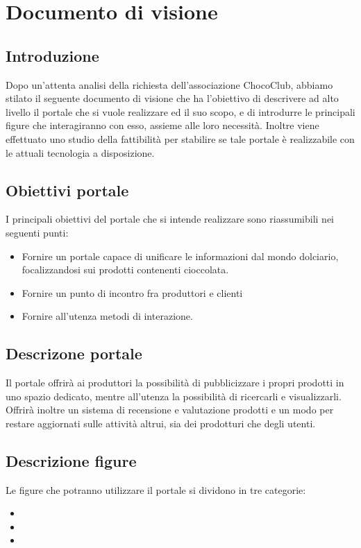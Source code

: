 \chapter{Documento di visione} 
\label{cha:documento_di_visione}

\section{Introduzione}
\label{sec:introduzione}
Dopo un'attenta analisi della richiesta dell'associazione ChocoClub, abbiamo stilato il seguente documento di visione che ha l'obiettivo di descrivere ad alto livello il portale che si vuole realizzare ed il suo scopo, e di introdurre le principali figure che interagiranno con esso, assieme alle loro necessità. Inoltre viene effettuato uno studio della fattibilità per stabilire se tale portale è realizzabile con le attuali tecnologia a disposizione.

\section{Obiettivi portale} 
\label{sec:descrizione_portale}
I principali obiettivi del portale che si intende realizzare sono riassumibili nei seguenti punti:
\begin{itemize}
	\item Fornire un portale capace di unificare le informazioni dal mondo dolciario, focalizzandosi sui prodotti contenenti cioccolata.
	\item Fornire un punto di incontro fra produttori e clienti
	\item Fornire all'utenza metodi di interazione.
\end{itemize}

\section{Descrizone portale}
\label{sec:descrizone_portale}
Il portale offrirà ai produttori la possibilità di pubblicizzare i propri prodotti in uno spazio dedicato, mentre all'utenza la possibilità di ricercarli e visualizzarli. Offrirà inoltre un sistema di recensione e valutazione prodotti e un modo per restare aggiornati sulle attività altrui, sia dei prodotturi che degli utenti.

\section{Descrizione figure} 
\label{sec:descrizionefigure}
Le figure che potranno utilizzare il portale si dividono in tre categorie:
\begin{itemize}
	\item {}
	\item {}
	\item {}
\end{itemize}

